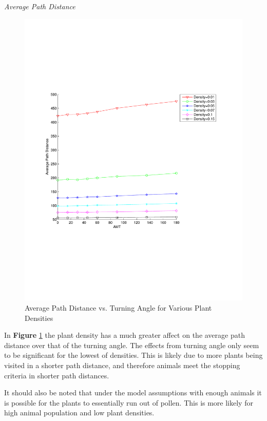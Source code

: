 \documentclass[preprint,12pt]{elsarticle}
\numberwithin{equation}{subsection}
\begin{document}
{\emph{Average Path Distance}}
\begin{figure}
  \begin{center}
  \includegraphics[width=1.0\textwidth]{PathVsAMT.pdf}
  \end{center}
  \caption{\small Average Path Distance vs. Turning Angle for Various Plant
Densities}
  \label{AvgPathN}
\end{figure}

In {\bf Figure} \ref{AvgPathN} the plant density has a much greater affect on
the average path distance over that of the turning angle. The effects from
turning angle only seem to be significant for the lowest of densities. This is
likely due to more plants being visited in a shorter path distance, and
therefore animals meet the stopping criteria in shorter path distances.

It should also be noted that under the model assumptions with enough animals it
is possible for the plants to essentially run out of pollen. This is more likely
for high animal population and low plant densities. %
\end{document}
